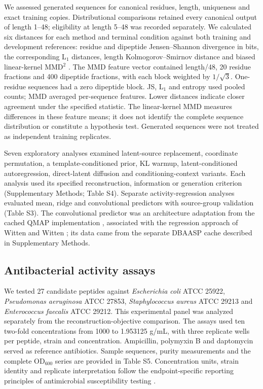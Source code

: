 \documentclass[unnumsec,webpdf,contemporary,large]{oup-authoring-template}
\begin{document}
We assessed generated sequences for canonical residues, length, uniqueness and exact training copies. Distributional comparisons retained every canonical output of length 1--48; eligibility at length 5--48 was recorded separately. We calculated six distances for each method and terminal condition against both training and development references: residue and dipeptide Jensen--Shannon divergence \cite{refJS} in bits, the corresponding L$_1$ distances, length Kolmogorov--Smirnov distance and biased linear-kernel MMD$^2$ \cite{refMMD}. The MMD feature vector contained length/48, 20 residue fractions and 400 dipeptide fractions, with each block weighted by $1/\sqrt{3}$. One-residue sequences had a zero dipeptide block. JS, L$_1$ and entropy used pooled counts; MMD averaged per-sequence features. Lower distances indicate closer agreement under the specified statistic. The linear-kernel MMD measures differences in these feature means; it does not identify the complete sequence distribution or constitute a hypothesis test. Generated sequences were not treated as independent training replicates.

Seven exploratory analyses examined latent-source replacement, coordinate permutation, a template-conditioned prior, KL warmup, latent-conditioned autoregression, direct-latent diffusion and conditioning-context variants. Each analysis used its specified reconstruction, information or generation criterion (Supplementary Methods; Table S4). Separate activity-regression analyses evaluated mean, ridge and convolutional predictors with source-group validation (Table S3). The convolutional predictor was an architecture adaptation from the cached QMAP implementation \cite{ref13}, associated with the regression approach of Witten and Witten \cite{ref12}; its data came from the separate DBAASP cache described in Supplementary Methods.

\subsection{Antibacterial activity assays}

We tested 27 candidate peptides against \textit{Escherichia coli} ATCC 25922, \textit{Pseudomonas aeruginosa} ATCC 27853, \textit{Staphylococcus aureus} ATCC 29213 and \textit{Enterococcus faecalis} ATCC 29212. This experimental panel was analyzed separately from the reconstruction-objective comparison. The assays used ten two-fold concentrations from 1000 to 1.953125 \textmu{}g/mL, with three replicate wells per peptide, strain and concentration. Ampicillin, polymyxin B and daptomycin served as reference antibiotics. Sample sequences, purity measurements and the complete OD$_{600}$ series are provided in Table S5. Concentration units, strain identity and replicate interpretation follow the endpoint-specific reporting principles of antimicrobial susceptibility testing \cite{ref64,ref65,ref66}.
\end{document}
